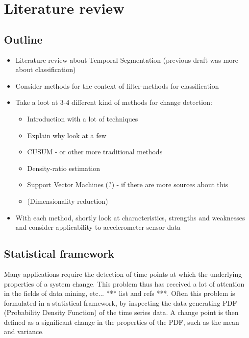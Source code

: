 
\chapter{Literature review}

\label{Chapter2} %


\section{Outline}
\begin{itemize}
  \item Literature review about Temporal Segmentation (previous draft was more about classification)
  \item Consider methods for the context of filter-methods for classification
  \item Take a loot at 3-4 different kind of methods for change detection:
    \begin{itemize}
      \item Introduction with a lot of techniques
      \item Explain why look at a few
      \item CUSUM - or other more traditional methods
      \item Density-ratio estimation
      \item Support Vector Machines (?) - if there are more sources about this
      \item (Dimensionality reduction)
    \end{itemize}
  \item With each method, shortly look at characteristics, strengths and weaknesses and consider applicability to accelerometer sensor data
\end{itemize}


\section{Statistical framework}\label{statistical-framework}
Many applications require the detection of time points at which the underlying properties of a system change.
This problem thus has received a lot of attention in the fields of data mining, etc... *** list and refs ***.
Often this problem is formulated in a statistical framework, by inspecting the data generating PDF (Probability Density Function) of the time series data.
A change point is then defined as a significant change in the properties of the PDF, such as the mean and variance.

